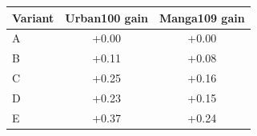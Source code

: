 \small
\setlength{\tabcolsep}{6pt}
\begin{tabular}{lcc}
\toprule
Variant & Urban100 gain & Manga109 gain \\
\midrule
A & +0.00 & +0.00 \\
B & +0.11 & +0.08 \\
C & +0.25 & +0.16 \\
D & +0.23 & +0.15 \\
E & +0.37 & +0.24 \\
\bottomrule
\end{tabular}
